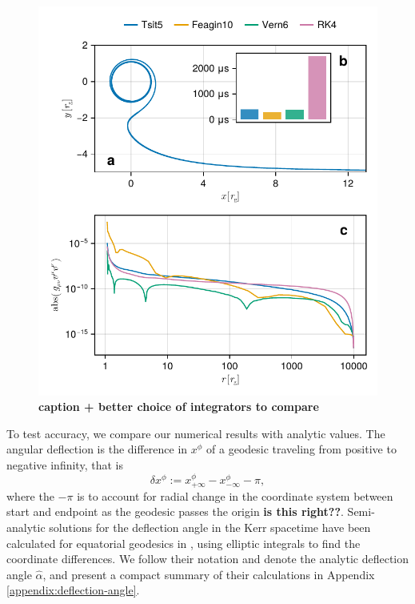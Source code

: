 \documentclass[fleqn,usenatbib]{mnras}
\newcommand{\todo}[1]{{\bf \color{red} #1}}
\begin{document}
\begin{figure}
	\centering
	\includegraphics[width=0.95\linewidth]{figures/stability.conservation.pdf}
	\caption{\todo{caption + better choice of integrators to compare}}
	\label{fig:dot-stability}
\end{figure}

To test accuracy, we compare our numerical results with analytic values. The angular deflection is the difference in $x^\phi$ of a geodesic traveling from positive to negative infinity, that is
\begin{equation}
	\delta x^\phi :=
		x^\phi_{+\infty} - x^\phi_{-\infty} 
		- \pi,
\end{equation}
where the $-\pi$ is to account for radial change in the coordinate system between start and endpoint as the geodesic passes the origin \todo{is this right??}. Semi-analytic solutions for the deflection angle in the Kerr spacetime have been calculated for equatorial geodesics in \cite{iyer_lights_2009}, using elliptic integrals to find the coordinate differences. We follow their notation and denote the analytic deflection angle $\hat{\alpha}$, and present a compact summary of their calculations in Appendix \ref{appendix:deflection-angle}. 
\end{document}
